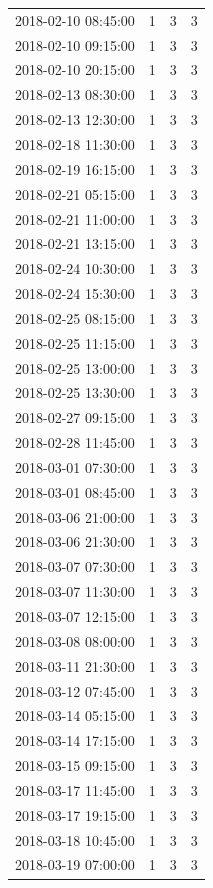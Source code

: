 \begin{tabular}{lrrr}
2018-02-10 08:45:00 & 1 & 3 & 3 \\
2018-02-10 09:15:00 & 1 & 3 & 3 \\
2018-02-10 20:15:00 & 1 & 3 & 3 \\
2018-02-13 08:30:00 & 1 & 3 & 3 \\
2018-02-13 12:30:00 & 1 & 3 & 3 \\
2018-02-18 11:30:00 & 1 & 3 & 3 \\
2018-02-19 16:15:00 & 1 & 3 & 3 \\
2018-02-21 05:15:00 & 1 & 3 & 3 \\
2018-02-21 11:00:00 & 1 & 3 & 3 \\
2018-02-21 13:15:00 & 1 & 3 & 3 \\
2018-02-24 10:30:00 & 1 & 3 & 3 \\
2018-02-24 15:30:00 & 1 & 3 & 3 \\
2018-02-25 08:15:00 & 1 & 3 & 3 \\
2018-02-25 11:15:00 & 1 & 3 & 3 \\
2018-02-25 13:00:00 & 1 & 3 & 3 \\
2018-02-25 13:30:00 & 1 & 3 & 3 \\
2018-02-27 09:15:00 & 1 & 3 & 3 \\
2018-02-28 11:45:00 & 1 & 3 & 3 \\
2018-03-01 07:30:00 & 1 & 3 & 3 \\
2018-03-01 08:45:00 & 1 & 3 & 3 \\
2018-03-06 21:00:00 & 1 & 3 & 3 \\
2018-03-06 21:30:00 & 1 & 3 & 3 \\
2018-03-07 07:30:00 & 1 & 3 & 3 \\
2018-03-07 11:30:00 & 1 & 3 & 3 \\
2018-03-07 12:15:00 & 1 & 3 & 3 \\
2018-03-08 08:00:00 & 1 & 3 & 3 \\
2018-03-11 21:30:00 & 1 & 3 & 3 \\
2018-03-12 07:45:00 & 1 & 3 & 3 \\
2018-03-14 05:15:00 & 1 & 3 & 3 \\
2018-03-14 17:15:00 & 1 & 3 & 3 \\
2018-03-15 09:15:00 & 1 & 3 & 3 \\
2018-03-17 11:45:00 & 1 & 3 & 3 \\
2018-03-17 19:15:00 & 1 & 3 & 3 \\
2018-03-18 10:45:00 & 1 & 3 & 3 \\
2018-03-19 07:00:00 & 1 & 3 & 3 \\

\end{tabular}

